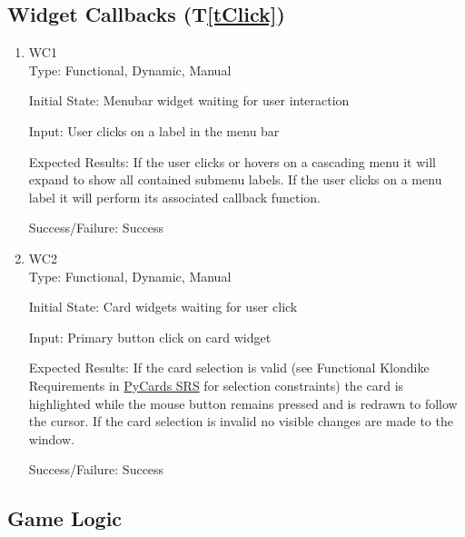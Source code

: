 \documentclass[12pt, titlepage]{article}
\newcommand{\tref}[1]{T\ref{#1}}
\begin{document}
	\subsection{Widget Callbacks (\tref{tClick})}
	\begin{enumerate}
		\item{WC1\\}
		Type: Functional, Dynamic, Manual
		
		Initial State: Menubar widget waiting for user interaction
		
		Input: User clicks on a label in the menu bar
		
		Expected Results: If the user clicks or hovers on a cascading menu it will expand
		to show all contained submenu labels. If the user clicks on a menu label
		it will perform its associated callback function.

		Success/Failure: Success

		\item{WC2\\}
		Type: Functional, Dynamic, Manual
		
		Initial State: Card widgets waiting for user click
		
		Input: Primary button click on card widget
		
		Expected Results: If the card selection is valid (see Functional Klondike Requirements in 
		\href{https://gitlab.cas.mcmaster.ca/premaa/pysol/tree/master/Doc/SRS}
		{PyCards SRS} for selection constraints) the card is highlighted while the
		mouse button remains pressed and is redrawn to follow the cursor. If the card
		selection is invalid no visible changes are made to the window.

		Success/Failure: Success
	\end{enumerate}
	\subsection{Game Logic}
	
\end{document}

